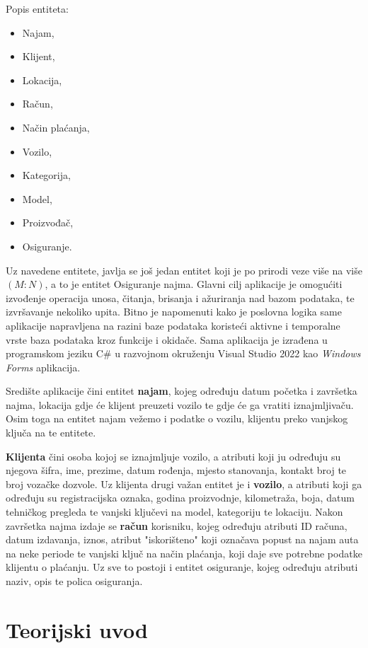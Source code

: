 \documentclass[]{foi}
\begin{document}
Popis entiteta:
\begin{itemize}
  \item Najam,
  \item Klijent,
  \item Lokacija,
  \item Račun,
  \item Način plaćanja,
  \item Vozilo,
  \item Kategorija,
  \item Model,
  \item Proizvođač,
  \item Osiguranje.
\end{itemize}

Uz navedene entitete, javlja se još jedan entitet koji je po prirodi veze više na više $(M:N)$, a to je entitet Osiguranje najma. Glavni cilj aplikacije je omogućiti izvođenje operacija unosa, čitanja, brisanja i ažuriranja nad bazom podataka, te izvršavanje nekoliko upita. Bitno je napomenuti kako je poslovna logika same aplikacije napravljena na razini baze podataka koristeći aktivne i temporalne vrste baza podataka kroz funkcije i okidače. Sama aplikacija je izrađena u programskom jeziku C\# u razvojnom okruženju Visual Studio 2022 kao \textit{Windows Forms} aplikacija.

Središte aplikacije čini entitet \textbf{najam}, kojeg određuju datum početka i završetka najma, lokacija gdje će klijent preuzeti vozilo te gdje će ga vratiti iznajmljivaču. Osim toga na entitet najam vežemo i podatke o vozilu, klijentu preko vanjskog ključa na te entitete.

\textbf{Klijenta} čini osoba kojoj se iznajmljuje vozilo, a atributi koji ju određuju su njegova šifra, ime, prezime, datum rođenja, mjesto stanovanja, kontakt broj te broj vozačke dozvole. Uz klijenta drugi važan entitet je i \textbf{vozilo}, a atributi koji ga određuju su registracijska oznaka, godina proizvodnje, kilometraža, boja, datum tehničkog pregleda te vanjski ključevi na model, kategoriju te lokaciju. Nakon završetka najma izdaje se \textbf{račun} korisniku, kojeg određuju atributi ID računa, datum izdavanja, iznos, atribut "iskorišteno" koji označava popust na najam auta na neke periode te vanjski ključ na način plaćanja, koji daje sve potrebne podatke klijentu o plaćanju. Uz sve to postoji i entitet osiguranje, kojeg određuju atributi naziv, opis te polica osiguranja.

\chapter{Teorijski uvod}
\end{document}
